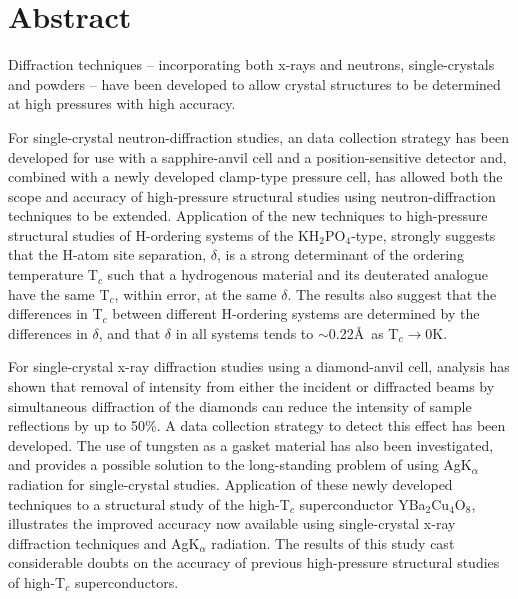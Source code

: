 \chapter*{Abstract}
\noindent 
Diffraction techniques -- incorporating both x-rays and neutrons, single-crystals and powders -- have been developed to allow crystal structures to be determined
at high pressures with high accuracy.

For single-crystal neutron-diffraction studies, an data collection
strategy has been developed for use with a sapphire-anvil cell and
a position-sensitive detector and, combined with a newly developed
clamp-type pressure
cell, has allowed both the scope and accuracy of high-pressure structural
studies using neutron-diffraction techniques to be extended.
Application of the new techniques to high-pressure
structural studies of H-ordering systems of the
KH$_2$PO$_4$-type, strongly suggests that the H-atom site
separation, $\delta$, is a strong determinant of the
ordering temperature T$_c$ such that a hydrogenous
material and its deuterated analogue have the same T$_c$, within error,  at
the same $\delta$.
The results also suggest that the differences in T$_c$ between
different H-ordering systems are determined by the differences in $\delta$, and
that $\delta$ in all systems tends to $\sim$0.22\AA\ as T$_c$$\rightarrow$0K.

For single-crystal x-ray diffraction studies using a diamond-anvil
cell, analysis has shown that removal of intensity from either the incident or
diffracted beams by simultaneous diffraction of the diamonds can reduce the
intensity of sample reflections by up to 50\%. A data collection strategy to
detect this effect has been developed. The use of tungsten as a gasket material
has also been investigated, and provides a possible solution to the
long-standing problem of using AgK$_{\alpha}$ radiation for single-crystal studies.
Application of these newly developed techniques to a structural study of the
high-T$_c$
superconductor YBa$_2$Cu$_4$O$_8$, illustrates the improved accuracy now
available using single-crystal x-ray diffraction techniques and
AgK$_{\alpha}$  radiation. The results of this study
cast considerable doubts on the accuracy of previous
high-pressure structural studies
of high-T$_c$ superconductors.
\vspace{10mm}
\normalsize



